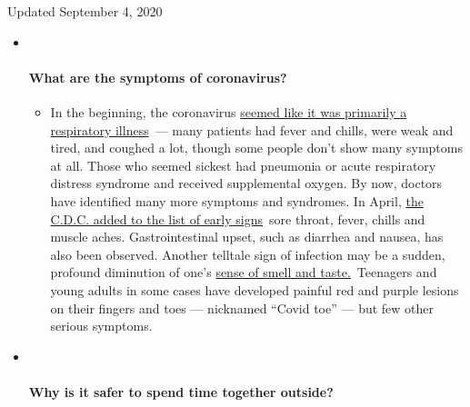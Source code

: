 Updated September 4, 2020

\begin{itemize}
\item ~
  \hypertarget{what-are-the-symptoms-of-coronavirus}{%
  \paragraph{What are the symptoms of
  coronavirus?}\label{what-are-the-symptoms-of-coronavirus}}

  \begin{itemize}
  \tightlist
  \item
    In the beginning, the coronavirus
    \href{https://www.nytimes3xbfgragh.onion/article/coronavirus-facts-history.html?action=click\&pgtype=Article\&state=default\&region=MAIN_CONTENT_3\&context=storylines_faq\#link-6817bab5}{seemed
    like it was primarily a respiratory illness}~--- many patients had
    fever and chills, were weak and tired, and coughed a lot, though
    some people don't show many symptoms at all. Those who seemed
    sickest had pneumonia or acute respiratory distress syndrome and
    received supplemental oxygen. By now, doctors have identified many
    more symptoms and syndromes. In April,
    \href{https://www.nytimes3xbfgragh.onion/2020/04/27/health/coronavirus-symptoms-cdc.html?action=click\&pgtype=Article\&state=default\&region=MAIN_CONTENT_3\&context=storylines_faq}{the
    C.D.C. added to the list of early signs}~sore throat, fever, chills
    and muscle aches. Gastrointestinal upset, such as diarrhea and
    nausea, has also been observed. Another telltale sign of infection
    may be a sudden, profound diminution of one's
    \href{https://www.nytimes3xbfgragh.onion/2020/03/22/health/coronavirus-symptoms-smell-taste.html?action=click\&pgtype=Article\&state=default\&region=MAIN_CONTENT_3\&context=storylines_faq}{sense
    of smell and taste.}~Teenagers and young adults in some cases have
    developed painful red and purple lesions on their fingers and toes
    --- nicknamed ``Covid toe'' --- but few other serious symptoms.
  \end{itemize}
\item ~
  \hypertarget{why-is-it-safer-to-spend-time-together-outside}{%
  \paragraph{Why is it safer to spend time together
  outside?}\label{why-is-it-safer-to-spend-time-together-outside}}


\end{itemize}
